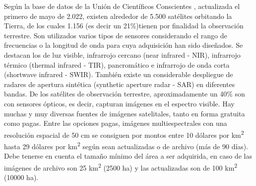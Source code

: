 Según la base de datos de la Unión de Científicos Conscientes \cite{noauthor_satellite_nodate}, actualizada el primero de mayo de 2.022, existen alrededor de 5.500 satélites orbitando la Tierra, de los cuales 1.156 (es decir un 21\%)tienen por finalidad la observación terrestre. Son utilizados varios tipos de sensores considerando el rango de frecuencias o la longitud de onda para cuya adquisición han sido diseñados. Se destacan los de luz visible, infrarrojo cercano (near infrared - NIR), infrarrojo térmico (thermal infrared - TIR), pancromático e infrarrojo de onda corta (shortwave infrared - SWIR). También existe un considerable despliegue de radares de apertura sintética (synthetic aperture radar - SAR) en diferentes bandas. De los satélites de observación terrestre, aproximadamente un 40\% son con sensores ópticos, es decir, capturan imágenes en el espectro visible.
Hay muchas y muy diversas fuentes de imágenes satelitales, tanto en forma gratuita como pagas. Entre las opciones pagas, imágenes multiespectrales con una resolución espacial de 50 cm se consiguen por montos entre 10 dólares por km\textsuperscript{2} hasta 29 dólares por km\textsuperscript{2} según sean actualizadas o de archivo (más de 90 días)\cite{noauthor_satellite_2020}. Debe tenerse en cuenta el tamaño mínimo del área a ser adquirida, en caso de las imágenes de archivo son 25 km\textsuperscript{2} (2500 ha) y las actualizadas son de 100 km\textsuperscript{2} (10000 ha).
